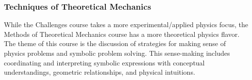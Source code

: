 \documentclass[english,aps,pra,reprint,noshowpacs,superscriptaddress]{revtex4-1}
\begin{document}



\subsubsection{Techniques of Theoretical Mechanics}

While the Challenges course takes a more experimental/applied physics
focus, the Methods of Theoretical Mechanics course has a more
theoretical physics flavor. The theme of this course is the discussion
of strategies for making sense of physics problems and symbolic
problem solving. This sense-making includes coordinating and
interpreting symbolic expressions with conceptual understandings,
geometric relationships, and physical intuitions.
\end{document}
